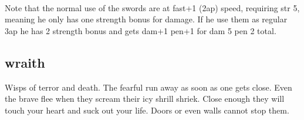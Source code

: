 \

Note that the normal use of the swords are at fast+1 (2ap) speed, requiring str 5, meaning he only has one strength bonus for damage. If he use them as regular 3ap he has 2 strength bonus and gets dam+1 pen+1 for dam 5 pen 2 total.


\goodbreak 
\subsection*{wraith}
\label{wraith}

Wisps of terror and death. The fearful run away as soon as one gets close. Even the brave flee when they scream their icy shrill shriek. Close enough they will touch your heart and suck out your life. Doors or even walls cannot stop them.

\

